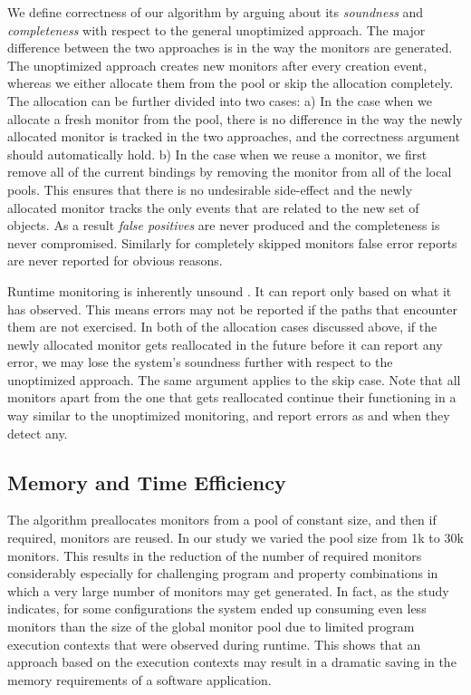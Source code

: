 We define correctness of our algorithm by arguing about its \textit{soundness} and \textit{completeness}
with respect to the general unoptimized approach. The major difference between 
the two approaches is in the way the monitors are generated. The unoptimized approach
creates new monitors after every creation event, whereas we either allocate them
from the pool or skip the allocation completely. The allocation can be further divided
into two cases: a) In the case when we allocate a fresh monitor from the pool, there is no
difference in the way the newly allocated monitor is tracked in the two approaches, and the
correctness argument should automatically hold. b) In the case when
we reuse a monitor, we first remove all of the current bindings by removing
the monitor from all of the local pools. This ensures that there is no undesirable side-effect
and the newly allocated monitor tracks the only events that are related to the new set of
objects. As a result \textit{false positives} are never produced and the completeness is
never compromised. Similarly for completely skipped monitors false error reports are 
never reported for obvious reasons.

Runtime monitoring is inherently 
unsound \cite{}. It can report only based on what it has observed. This means errors 
may not be reported if the paths that encounter them are not exercised. In both of the allocation cases
discussed above, if the newly allocated monitor gets reallocated in the future before it can report
any error, we may lose the system's soundness further with respect to the unoptimized approach. The same argument 
applies to the skip case. Note that all monitors apart from the one that gets reallocated continue
their functioning in a way similar to the unoptimized monitoring, and report errors as and when they detect any.

\subsection{Memory and Time Efficiency }
\label{subsec:memory efficiency}

The algorithm preallocates monitors from a pool of constant size, and then if 
required, monitors are reused. In our study we varied the pool size from 1k 
to 30k monitors. This results in the reduction of the number of required monitors 
considerably especially for challenging program and property combinations in 
which a very large number of monitors may get generated. In fact, as the study indicates,
for some configurations the system ended up consuming
even less monitors than the size of the global monitor pool due to
limited program execution contexts that were
observed during runtime. This shows that an approach based on the execution
contexts may result in a dramatic saving in the memory requirements of a
software application.

